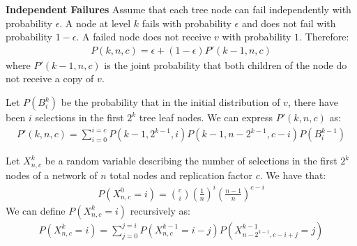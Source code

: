 \documentclass[10pt]{style}
\theoremstyle{plain}
\theoremstyle{definition}
\theoremstyle{remark}
\numberwithin{equation}{section}
\begin{document}
  {\bf Independent Failures} Assume that each tree node can fail
  independently with probability $\epsilon$. A node at level $k$ fails
  with probability $\epsilon$ and  does not fail with probability
  $1-\epsilon$. A failed node does not receive $v$ with probability
  $1$. Therefore:
  \begin{eqnarray*}
    P(k,n,c) = \epsilon + (1-\epsilon)P'(k-1, n, c)
  \end{eqnarray*}
  where $P'(k-1,n,c)$ is the joint probability that both children of
  the node do not receive a copy of $v$.

  Let $P(B_i^k)$ be the probability that in the initial distribution
  of $v$, there have been $i$ selections in the first $2^k$ tree leaf
  nodes. We can express $P'(k,n,c)$ as:
  \begin{eqnarray*}
    P'(k, n, c) = \sum_{i=0}^{i=c}P(k-1,2^{k-1},i)P(k-1, n-2^{k-1}, c-i)P(B_i^{k-1})
  \end{eqnarray*}

  Let $X_{n,c}^k$ be a random variable describing the number of
  selections in the first $2^k$ nodes of a network of $n$ total nodes
  and replication factor $c$. We have that:
  \begin{eqnarray*}
    P(X_{n,c}^0=i) = {c \choose i}(\frac{1}{n})^i(\frac{n-1}{n})^{c-i} 
  \end{eqnarray*}
  We can define $P(X_{n,c}^k=i)$ recursively as:
  \begin{eqnarray*}
    P(X_{n,c}^k=i) = \sum_{j=0}^{j=i}P(X_{n,c}^{k-1}=
    i-j)P(X_{n-2^{k-1},c-i+j}^{k-1}= j)
  \end{eqnarray*}
\end{document}

